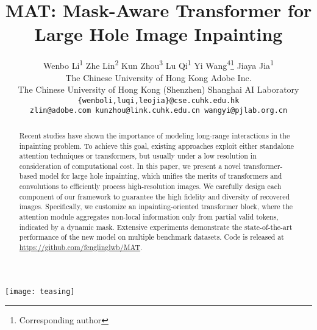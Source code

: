 \documentclass[10pt,twocolumn,letterpaper]{article}
\begin{document}
	
\title{MAT: Mask-Aware Transformer for Large Hole Image Inpainting}
	
\author{Wenbo Li\textsuperscript{1} \quad Zhe Lin\textsuperscript{2} \quad Kun Zhou\textsuperscript{3} \quad Lu Qi\textsuperscript{1} \quad Yi Wang\textsuperscript{4}\thanks{Corresponding author} \quad Jiaya Jia\textsuperscript{1} \\
		The Chinese University of Hong Kong \quad Adobe Inc. \\
		The Chinese University of Hong Kong (Shenzhen) \quad Shanghai AI Laboratory \\
		{\tt\small \{wenboli,luqi,leojia\}@cse.cuhk.edu.hk} \\
		{\tt\small zlin@adobe.com \quad kunzhou@link.cuhk.edu.cn \quad wangyi@pjlab.org.cn}
		\vspace{-0.4in}
	}
	\maketitle
	
	
	\begin{strip}\centering
		\texttt{[image: teasing]}
		 \end{strip}
	
\begin{abstract}




		Recent studies have shown the importance of modeling long-range interactions in the inpainting problem. To achieve this goal, existing approaches exploit either standalone attention techniques or transformers, but usually under a low resolution in consideration of computational cost. In this paper, we present a novel transformer-based model for large hole inpainting, which unifies the merits of transformers and convolutions to efficiently process high-resolution images. We carefully design each component of our framework to guarantee the high fidelity and diversity of recovered images. Specifically, we customize an inpainting-oriented transformer block, where the attention module aggregates non-local information only from partial valid tokens, indicated by a dynamic mask. Extensive experiments demonstrate the state-of-the-art performance of the new model on multiple benchmark datasets. Code is released at \url{https://github.com/fenglinglwb/MAT}.
		
	\end{abstract}
	
\end{document}
